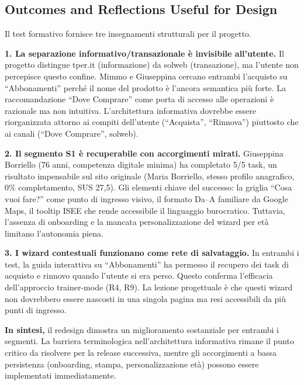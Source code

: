 ﻿\documentclass[11pt,a4paper]{article}
\begin{document}
\subsection*{Outcomes and Reflections Useful for Design}
\begin{tcolorbox}[base]
Il test formativo fornisce tre insegnamenti strutturali per il progetto.

\medskip

\noindent\textbf{1. La separazione informativo/transazionale è invisibile
all'utente.} Il progetto distingue tper.it (informazione) da solweb
(transazione), ma l'utente non percepisce questo confine. Mimmo e
Giuseppina cercano entrambi l'acquisto su ``Abbonamenti'' perché il nome
del prodotto è l'ancora semantica più forte. La raccomandazione ``Dove
Comprare'' come porta di accesso alle operazioni è razionale ma non
intuitiva. L'architettura informativa dovrebbe essere riorganizzata attorno
ai compiti dell'utente (``Acquista'', ``Rinnova'') piuttosto che ai canali
(``Dove Comprare'', solweb).

\medskip

\noindent\textbf{2. Il segmento S1 è recuperabile con accorgimenti mirati.}
Giuseppina Borriello (76 anni, competenza digitale minima) ha completato
5/5 task, un risultato impensabile sul sito originale (Maria Borriello,
stesso profilo anagrafico, 0\% completamento, SUS 27,5). Gli elementi
chiave del successo: la griglia ``Cosa vuoi fare?'' come punto di ingresso
visivo, il formato Da--A familiare da Google Maps, il tooltip ISEE che
rende accessibile il linguaggio burocratico. Tuttavia, l'assenza di
onboarding e la mancata personalizzazione del wizard per età limitano
l'autonomia piena.

\medskip

\noindent\textbf{3. I wizard contestuali funzionano come rete di
salvataggio.} In entrambi i test, la guida interattiva su ``Abbonamenti''
ha permesso il recupero dei task di acquisto e rinnovo quando l'utente si
era perso. Questo conferma l'efficacia dell'approccio trainer-mode (R4,
R9). La lezione progettuale è che questi wizard non dovrebbero essere
nascosti in una singola pagina ma resi accessibili da più punti di
ingresso.

\medskip

\noindent\textbf{In sintesi,} il redesign dimostra un miglioramento
sostanziale per entrambi i segmenti. La barriera terminologica
nell'architettura informativa rimane il punto critico da risolvere per la
release successiva, mentre gli accorgimenti a bassa persistenza
(onboarding, stampa, personalizzazione età) possono essere implementati
immediatamente.
\end{tcolorbox}
\end{document}
